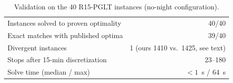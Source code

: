 \begin{table}[htbp]
\centering
\caption{Validation on the 40 R15-PGLT instances (no-night configuration).}
\label{tab:validation}
\small
\begin{tabular}{lr}
\toprule
Instances solved to proven optimality & 40/40 \\
Exact matches with published optima & 39/40 \\
Divergent instances & 1 (ours 1410 vs.\ 1425, see text) \\
Stops after 15-min discretization & 23--180 \\
Solve time (median / max) & $<1$~s / 64~s \\
\bottomrule
\end{tabular}
\end{table}

